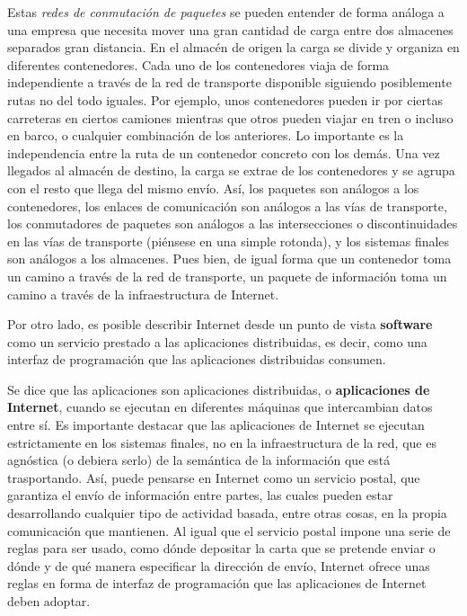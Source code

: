 \documentclass[a4paper]{article}
\begin{document}
    Estas \emph{redes de conmutación de paquetes} se pueden entender de forma análoga a una empresa que necesita mover una gran cantidad de carga entre dos almacenes separados gran distancia. En el almacén de origen la carga se divide y organiza en diferentes contenedores. Cada uno de los contenedores viaja de forma independiente a través de la red de transporte disponible siguiendo posiblemente rutas no del todo iguales. Por ejemplo, unos contenedores pueden ir por ciertas carreteras en ciertos camiones mientras que otros pueden viajar en tren o incluso en barco, o cualquier combinación de los anteriores. Lo importante es la independencia entre la ruta de un contenedor concreto con los demás. Una vez llegados al almacén de destino, la carga se extrae de los contenedores y se agrupa con el resto que llega del mismo envío. Así, los paquetes son análogos a los contenedores, los enlaces de comunicación son análogos a las vías de transporte, los conmutadores de paquetes son análogos a las intersecciones o discontinuidades en las vías de transporte (piénsese en una simple rotonda), y los sistemas finales son análogos a los almacenes. Pues bien, de igual forma que un contenedor toma un camino a través de la red de transporte, un paquete de información toma un camino a través de la infraestructura de Internet.
    
    Por otro lado, es posible describir Internet desde un punto de vista \textbf{software} como un servicio prestado a las aplicaciones distribuidas, es decir, como una interfaz de programación que las aplicaciones distribuidas consumen.
    
    Se dice que las aplicaciones son aplicaciones distribuidas, o \textbf{aplicaciones de Internet}, cuando se ejecutan en diferentes máquinas que intercambian datos entre sí. Es importante destacar que las aplicaciones de Internet se ejecutan estrictamente en los sistemas finales, no en la infraestructura de la red, que es agnóstica (o debiera serlo) de la semántica de la información que está trasportando. Así, puede pensarse en Internet como un servicio postal, que garantiza el envío de información entre partes, las cuales pueden estar desarrollando cualquier tipo de actividad basada, entre otras cosas, en la propia comunicación que mantienen. Al igual que el servicio postal impone una serie de reglas para ser usado, como dónde depositar la carta que se pretende enviar o dónde y de qué manera especificar la dirección de envío, Internet ofrece unas reglas en forma de interfaz de programación que las aplicaciones de Internet deben adoptar.
    
\end{document}
